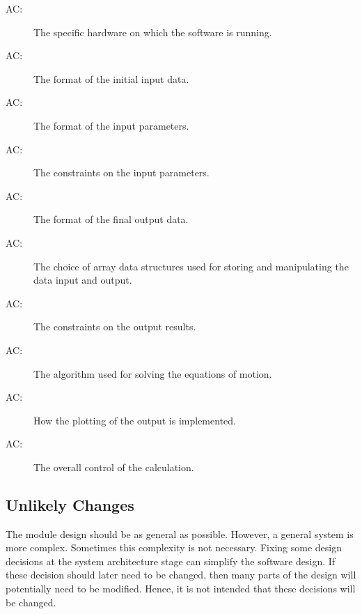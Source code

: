 \documentclass[12pt, titlepage]{article}
\newcounter{acnum}
\newcommand{\actheacnum}{AC\theacnum}
\begin{document}
\begin{description}
\item[ \actheacnum \label{acHardware}:] The specific
  hardware on which the software is running.
\item[ \actheacnum \label{acInput}:] The format of the initial input data.
\item[ \actheacnum \label{acParams}:] The format of the  input parameters.
\item[ \actheacnum \label{acVerify}:] The constraints on
  the input parameters.
\item[ \actheacnum \label{acOutput}:] The format of the  final output data.
\item[ \actheacnum \label{acDS}:] The choice of array data structures used for storing and manipulating the data input and output.
\item[ \actheacnum \label{acVerifyOut}:] The constraints on the output results.
\item[ \actheacnum \label{acSolver}:] The algorithm used for solving the equations of motion.
\item[ \actheacnum \label{acPlot}:] How the plotting of the output is implemented.
\item[ \actheacnum \label{acControl}:] The overall control of the calculation.
\end{description}

\subsection{Unlikely Changes} \label{SecUchange}

The module design should be as general as possible. However, a general system is
more complex. Sometimes this complexity is not necessary. Fixing some design
decisions at the system architecture stage can simplify the software design. If
these decision should later need to be changed, then many parts of the design
will potentially need to be modified. Hence, it is not intended that these
decisions will be changed.
\end{document}
